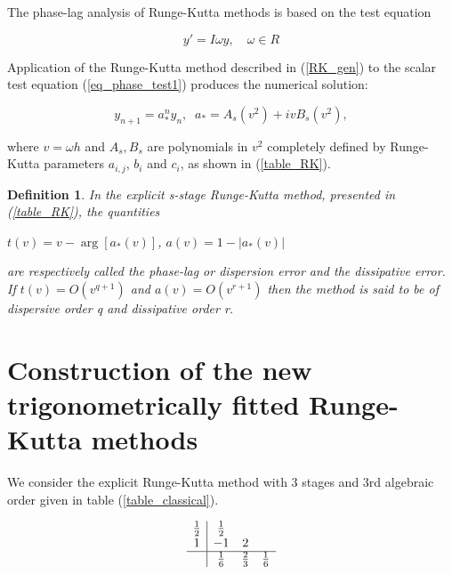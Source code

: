 \documentclass[numreferences]{kluwer}
\newtheorem{defn}{Definition}
\begin{document}
\begin{article}
The phase-lag analysis of Runge-Kutta methods is based on the test equation

\begin{equation}\label{eq_phase_test1}
y' = I \omega y, \quad \omega \in R
\end{equation}

\noindent Application of the Runge-Kutta method described in (\ref{RK_gen}) to the scalar test
equation (\ref{eq_phase_test1}) produces the numerical solution:

\begin{equation}\label{eq_phase_test2}
{y_{n+1}=a^{n}_{*}}y_{n},\;\; a_{*}=A_{s}(v^{2})+ivB_{s}(v^{2}),
\end{equation}

\noindent where $v=\omega h$ and $A_{s}, B_{s}$ are polynomials in $v^{2}$ completely defined by
Runge-Kutta parameters $a_{i,j}$, $b_{i}$ and $c_{i}$, as shown in (\ref{table_RK}).

\begin{defn}\label{defn_dissip}\emph{\cite{royal}}
\emph{ In the explicit \emph{s}-stage Runge-Kutta method, presented in (\ref{table_RK}), the
quantities}
\begin{center}
$t(v)=v-\arg[a_{*}(v)]$, \quad $a(v)=1-|a_{*}(v)|$\\
\end{center}
\emph{are respectively called the \emph{phase-lag} or \emph{dispersion error} and the
\emph{dissipative error}. If $t(v)=O(v^{q+1})$ and $a(v)=O(v^{r+1})$ then the method is said to be
of dispersive order \emph{q} and dissipative order \emph{r}}.
\end{defn}

\section{Construction of the new trigonometrically fitted Runge-Kutta methods}
\label{Construction}

We consider the explicit Runge-Kutta method with 3 stages and 3rd algebraic order given in table (\ref{table_classical}).

{}
\begin{equation}
\begin{array}{c|cccccccc}
\label{table_classical}
\frac{1}{2}  & \frac{1}{2}\\
1            & -   1            & 2\\
\hline
        & \frac{1}{6}  & \frac{2}{3} & \frac{1}{6}
\end{array}
\end{equation}
{}


\end{article}
\end{document}
